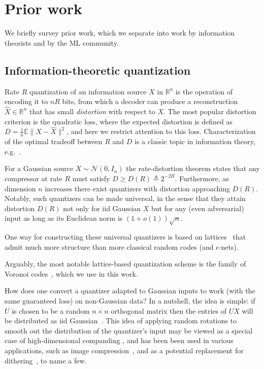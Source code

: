\documentclass{article}
\newcommand{\RR}{\mathbb{R}}
\def\EE{\mathbb{E}}
\newcommand{\m}{\mathcal}
\theoremstyle{plain}
\theoremstyle{definition}
\theoremstyle{remark}
\begin{document}
\section{Prior work}\label{sec:prior}

We briefly survey prior work, which we separate into work by information theorists and by the ML community.

\subsection{Information-theoretic quantization}

Rate $R$ quantization of an information source $X$ in $\RR^n$ is the operation of encoding it to $nR$ bits, from which a decoder can produce a reconstruction $\hat{X}\in\RR^n$ that has small \emph{distortion} with respect to $X$. The most popular distortion criterion is the quadratic loss, where the expected distortion is defined as $D=\frac{1}{n}\EE\|X-\hat{X}\|^2$, and here we restrict attention to this loss. Characterization of the optimal tradeoff between $R$ and $D$ is a classic topic in information theory, e.g.~\citep[Part V]{PWbook24}.

For a Gaussian source $X\sim\m{N}(0,I_n)$ the rate-distortion theorem states that any compressor at rate $R$ must satisfy 
$D\geq D(R)\triangleq 2^{-2R}$. Furthermore, as dimension $n$ increases there exist quantizers with distortion approaching $D(R)$. Notably, such quantizers can be made universal, in the sense that they attain distortion $D(R)$ not only for iid Gaussian $X$ but for any  (even adversarial) input as long as its Euclidean norm is $(1+o(1))\sqrt{n}$.
%

One way for constructing these universal quantizers is based on lattices~\cite{ramiBook} that admit much more structure than more classical random codes (and $\epsilon$-nets).

Arguably, the most notable lattice-based quantization scheme is the family of Voronoi codes~\cite{ConwaySloane83}, which we use in this work.

How does one convert a quantizer adapted to Gaussian inputs to work (with the same guaranteed loss) on non-Gaussian data? In a nutshell, the idea is simple: if $U$ is chosen to be a  random $n\times n$ orthogonal matrix then the entries of $UX$ will be distributed as iid Gaussian~\cite{stam1982limit}. 
This idea of applying random rotations to smooth out the distribution of the quantizer's input may be viewed as a special case of high-dimensional companding \cite{gersho1979asymptotically}, and has been been used in various applications, such as image compression~\cite{hung1998multidimensional}, and as a potential replacement for dithering~\cite{hadad2016dithered}, to name a few. 
\end{document}
